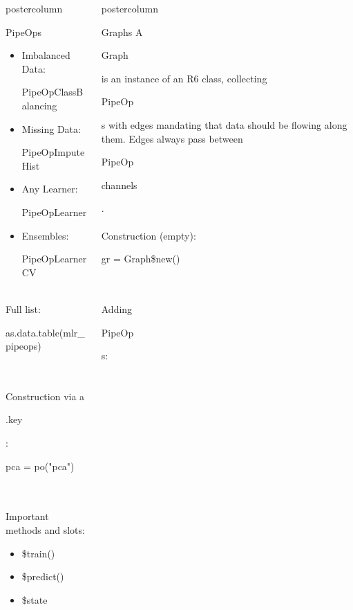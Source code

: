 \documentclass{beamer}
\newlength{\columnheight} %
\newcommand{\codeinline}[1]{\begin{codeboxinline}#1\end{codeboxinline}}
\begin{document}
\begin{frame}[fragile]{}
\begin{columns}
\begin{column}{.245\textwidth}
\begin{beamercolorbox}[center]{postercolumn}
\begin{minipage}{.98\textwidth}
{\begin{myblock}{PipeOps}
\begin{itemize}
                \item Imbalanced Data: \codeinline{PipeOpClassBalancing}
                \item Missing Data: \codeinline{PipeOpImputeHist}
                \item Any Learner: \codeinline{PipeOpLearner}
                \item Ensembles: \codeinline{PipeOpLearnerCV}
              \end{itemize}
              \ \\
              Full list: \codeinline{as.data.table(mlr\_pipeops)} \\
              \ \\
              Construction via a \codeinline{.key}: \codeinline{pca = po("pca")} \\
              \ \\
              Important methods and slots:
              \begin{itemize}
                \item \codeinline{\$train()}
                \item \codeinline{\$predict()}
                \item \codeinline{\$state}
              \end{itemize}
						\end{myblock}
						\vfill}
				\end{minipage}
			\end{beamercolorbox}
		\end{column}
		\begin{column}{.245\textwidth}
			\begin{beamercolorbox}[center]{postercolumn}
				\begin{minipage}{.98\textwidth}
					\parbox[t][\columnheight]{\textwidth}{
						\begin{myblock}{Graphs}
              A \codeinline{Graph} is an instance of an R6 class, collecting \codeinline{PipeOp}s with edges mandating that data should be flowing along them. Edges always pass between \codeinline{PipeOp} \codeinline{channels}.
              \\
              \\
              Construction (empty): \codeinline{gr = Graph\$new()} \\
              \ \\
              Adding \codeinline{PipeOp}s:
              \begin{codeboxmultiline}[width=20cm]

\end{codeboxmultiline}
\end{myblock}}
\end{minipage}
\end{beamercolorbox}
\end{column}
\end{columns}
\end{frame}
\end{document}
